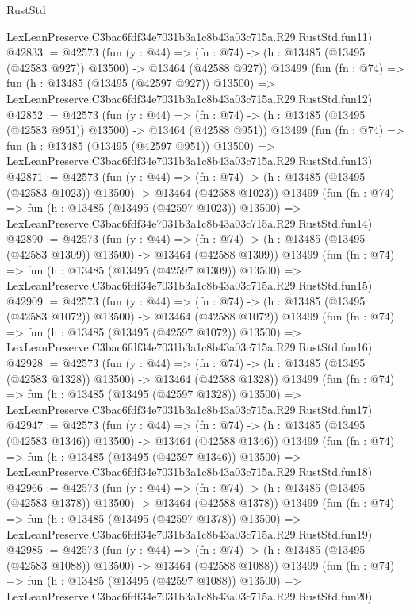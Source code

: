 \begin{lexlean}{RustStd}
\begin{coremodule}
    LexLeanPreserve.C3bac6fdf34e7031b3a1c8b43a03c715a.R29.RustStd.fun11)
@42833 := @42573
    (fun (y : @44) =>
    (fn : @74) -> (h : @13485 (@13495 (@42583 @927)) @13500) -> @13464 (@42588 @927))
    @13499
    (fun (fn : @74) =>
    fun (h : @13485 (@13495 (@42597 @927)) @13500) =>
    LexLeanPreserve.C3bac6fdf34e7031b3a1c8b43a03c715a.R29.RustStd.fun12)
@42852 := @42573
    (fun (y : @44) =>
    (fn : @74) -> (h : @13485 (@13495 (@42583 @951)) @13500) -> @13464 (@42588 @951))
    @13499
    (fun (fn : @74) =>
    fun (h : @13485 (@13495 (@42597 @951)) @13500) =>
    LexLeanPreserve.C3bac6fdf34e7031b3a1c8b43a03c715a.R29.RustStd.fun13)
@42871 := @42573
    (fun (y : @44) =>
    (fn : @74) -> (h : @13485 (@13495 (@42583 @1023)) @13500) -> @13464 (@42588 @1023))
    @13499
    (fun (fn : @74) =>
    fun (h : @13485 (@13495 (@42597 @1023)) @13500) =>
    LexLeanPreserve.C3bac6fdf34e7031b3a1c8b43a03c715a.R29.RustStd.fun14)
@42890 := @42573
    (fun (y : @44) =>
    (fn : @74) -> (h : @13485 (@13495 (@42583 @1309)) @13500) -> @13464 (@42588 @1309))
    @13499
    (fun (fn : @74) =>
    fun (h : @13485 (@13495 (@42597 @1309)) @13500) =>
    LexLeanPreserve.C3bac6fdf34e7031b3a1c8b43a03c715a.R29.RustStd.fun15)
@42909 := @42573
    (fun (y : @44) =>
    (fn : @74) -> (h : @13485 (@13495 (@42583 @1072)) @13500) -> @13464 (@42588 @1072))
    @13499
    (fun (fn : @74) =>
    fun (h : @13485 (@13495 (@42597 @1072)) @13500) =>
    LexLeanPreserve.C3bac6fdf34e7031b3a1c8b43a03c715a.R29.RustStd.fun16)
@42928 := @42573
    (fun (y : @44) =>
    (fn : @74) -> (h : @13485 (@13495 (@42583 @1328)) @13500) -> @13464 (@42588 @1328))
    @13499
    (fun (fn : @74) =>
    fun (h : @13485 (@13495 (@42597 @1328)) @13500) =>
    LexLeanPreserve.C3bac6fdf34e7031b3a1c8b43a03c715a.R29.RustStd.fun17)
@42947 := @42573
    (fun (y : @44) =>
    (fn : @74) -> (h : @13485 (@13495 (@42583 @1346)) @13500) -> @13464 (@42588 @1346))
    @13499
    (fun (fn : @74) =>
    fun (h : @13485 (@13495 (@42597 @1346)) @13500) =>
    LexLeanPreserve.C3bac6fdf34e7031b3a1c8b43a03c715a.R29.RustStd.fun18)
@42966 := @42573
    (fun (y : @44) =>
    (fn : @74) -> (h : @13485 (@13495 (@42583 @1378)) @13500) -> @13464 (@42588 @1378))
    @13499
    (fun (fn : @74) =>
    fun (h : @13485 (@13495 (@42597 @1378)) @13500) =>
    LexLeanPreserve.C3bac6fdf34e7031b3a1c8b43a03c715a.R29.RustStd.fun19)
@42985 := @42573
    (fun (y : @44) =>
    (fn : @74) -> (h : @13485 (@13495 (@42583 @1088)) @13500) -> @13464 (@42588 @1088))
    @13499
    (fun (fn : @74) =>
    fun (h : @13485 (@13495 (@42597 @1088)) @13500) =>
    LexLeanPreserve.C3bac6fdf34e7031b3a1c8b43a03c715a.R29.RustStd.fun20)

\end{coremodule}
\end{lexlean}
